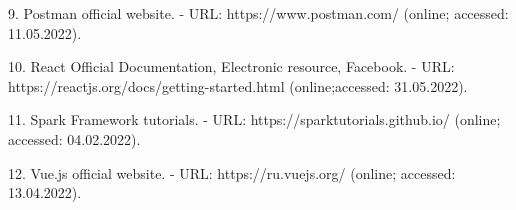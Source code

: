 9. Postman official website. - URL: https://www.postman.com/ (online; accessed: 11.05.2022).

10. React Official Documentation, Electronic resource, Facebook. - URL: https://reactjs.org/docs/getting-started.html (online;accessed: 31.05.2022).

11. Spark Framework tutorials. - URL: https://sparktutorials.github.io/ (online; accessed: 04.02.2022).

12. Vue.js official website. - URL: https://ru.vuejs.org/ (online; accessed: 13.04.2022).







